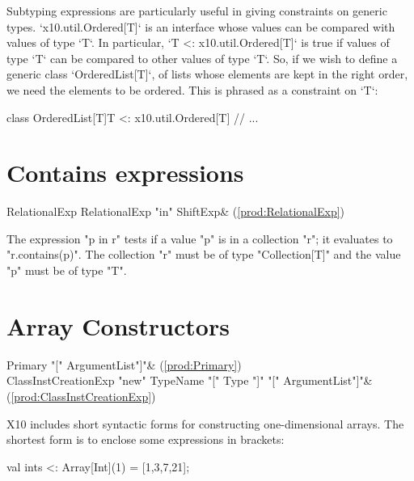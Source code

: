 Subtyping expressions are particularly useful in giving constraints on generic
types.  \xcd`x10.util.Ordered[T]` is an interface whose values can be compared
with values of type \xcd`T`. 
In particular, \xcd`T <: x10.util.Ordered[T]` is
true if values of type \xcd`T` can be compared to other values of type
\xcd`T`.  So, if we wish to define a generic class \xcd`OrderedList[T]`, of
lists whose elements are kept in the right order, we need the elements to be
ordered.  This is phrased as a constraint on \xcd`T`: 
\begin{xten}
class OrderedList[T]{T <: x10.util.Ordered[T]} {
  // ...
}
\end{xten}
%




\section{Contains expressions}

\begin{bbgrammar}
 RelationalExp    \: RelationalExp \xcd"in" ShiftExp& (\ref{prod:RelationalExp})\\%

\end{bbgrammar}


The expression \xcd"p in r" tests if a value \xcd"p" is in a collection
\xcd"r"; it evaluates to \xcd"r.contains(p)".
The collection \xcd"r"
must be of type \xcd"Collection[T]" and the value \xcd"p" must
be of type \xcd"T".

\section{Array Constructors}
\label{sect:ArrayCtors}

\begin{bbgrammar}
 Primary    \: \xcd"[" ArgumentList\opt \xcd"]"& (\ref{prod:Primary})\\%
 ClassInstCreationExp    \:\xcd"new" TypeName \xcd"[" Type \xcd"]" \xcd"[" ArgumentList\opt \xcd"]"& (\ref{prod:ClassInstCreationExp})\\%

\end{bbgrammar}

X10 includes short syntactic forms for constructing one-dimensional arrays.
The shortest form is to enclose some expressions in brackets: 
\begin{xten}
val ints <: Array[Int](1) = [1,3,7,21];
\end{xten}


